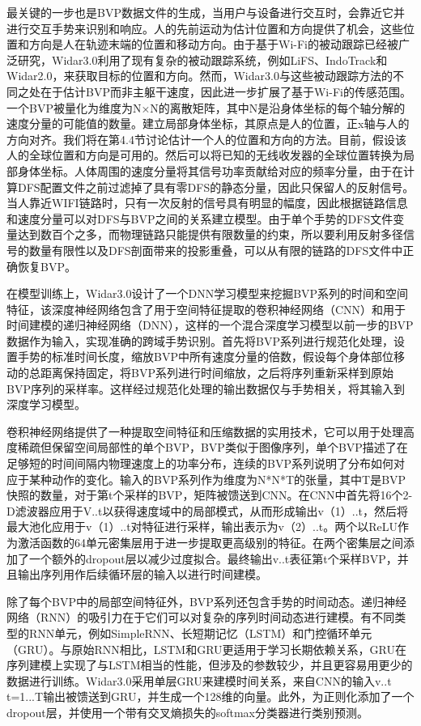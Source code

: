 \documentclass[a4paper]{article}
\begin{document}
  最关键的一步也是BVP数据文件的生成，当用户与设备进行交互时，会靠近它并进行交互手势来识别和响应。人的先前运动为估计位置和方向提供了机会，这些位置和方向是人在轨迹末端的位置和移动方向。由于基于Wi-Fi的被动跟踪已经被广泛研究，Widar3.0利用了现有复杂的被动跟踪系统，例如LiFS、IndoTrack和Widar2.0，来获取目标的位置和方向。然而，Widar3.0与这些被动跟踪方法的不同之处在于估计BVP而非主躯干速度，因此进一步扩展了基于Wi-Fi的传感范围。一个BVP被量化为维度为N×N的离散矩阵，其中N是沿身体坐标的每个轴分解的速度分量的可能值的数量。建立局部身体坐标，其原点是人的位置，正x轴与人的方向对齐。我们将在第4.4节讨论估计一个人的位置和方向的方法。目前，假设该人的全球位置和方向是可用的。然后可以将已知的无线收发器的全球位置转换为局部身体坐标。人体周围的速度分量将其信号功率贡献给对应的频率分量，由于在计算DFS配置文件之前过滤掉了具有零DFS的静态分量，因此只保留人的反射信号。当人靠近WIFI链路时，只有一次反射的信号具有明显的幅度，因此根据链路信息和速度分量可以对DFS与BVP之间的关系建立模型。由于单个手势的DFS文件变量达到数百个之多，而物理链路只能提供有限数量的约束，所以要利用反射多径信号的数量有限性以及DFS剖面带来的投影重叠，可以从有限的链路的DFS文件中正确恢复BVP。 \par
  在模型训练上，Widar3.0设计了一个DNN学习模型来挖掘BVP系列的时间和空间特征，该深度神经网络包含了用于空间特征提取的卷积神经网络（CNN）和用于时间建模的递归神经网络（DNN），这样的一个混合深度学习模型以前一步的BVP数据作为输入，实现准确的跨域手势识别。首先将BVP系列进行规范化处理，设置手势的标准时间长度，缩放BVP中所有速度分量的倍数，假设每个身体部位移动的总距离保持固定，将BVP系列进行时间缩放，之后将序列重新采样到原始BVP序列的采样率。这样经过规范化处理的输出数据仅与手势相关，将其输入到深度学习模型。 \par
  卷积神经网络提供了一种提取空间特征和压缩数据的实用技术，它可以用于处理高度稀疏但保留空间局部性的单个BVP，BVP类似于图像序列，单个BVP描述了在足够短的时间间隔内物理速度上的功率分布，连续的BVP系列说明了分布如何对应于某种动作的变化。输入的BVP系列作为维度为N*N*T的张量，其中T是BVP快照的数量，对于第t个采样的BVP，矩阵被馈送到CNN。在CNN中首先将16个2-D滤波器应用于V..t以获得速度域中的局部模式，从而形成输出v（1）..t，然后将最大池化应用于v（1）..t对特征进行采样，输出表示为v（2）..t。两个以ReLU作为激活函数的64单元密集层用于进一步提取更高级别的特征。在两个密集层之间添加了一个额外的dropout层以减少过度拟合。最终输出v..t表征第t个采样BVP，并且输出序列用作后续循环层的输入以进行时间建模。 \par
  除了每个BVP中的局部空间特征外，BVP系列还包含手势的时间动态。递归神经网络（RNN）的吸引力在于它们可以对复杂的序列时间动态进行建模。有不同类型的RNN单元，例如SimpleRNN、长短期记忆（LSTM）和门控循环单元（GRU）。与原始RNN相比，LSTM和GRU更适用于学习长期依赖关系，GRU在序列建模上实现了与LSTM相当的性能，但涉及的参数较少，并且更容易用更少的数据进行训练。Widar3.0采用单层GRU来建模时间关系，来自CNN的输入{v..t t=1...T}输出被馈送到GRU，并生成一个128维的向量。此外，为正则化添加了一个dropout层，并使用一个带有交叉熵损失的softmax分类器进行类别预测。
\end{document}
